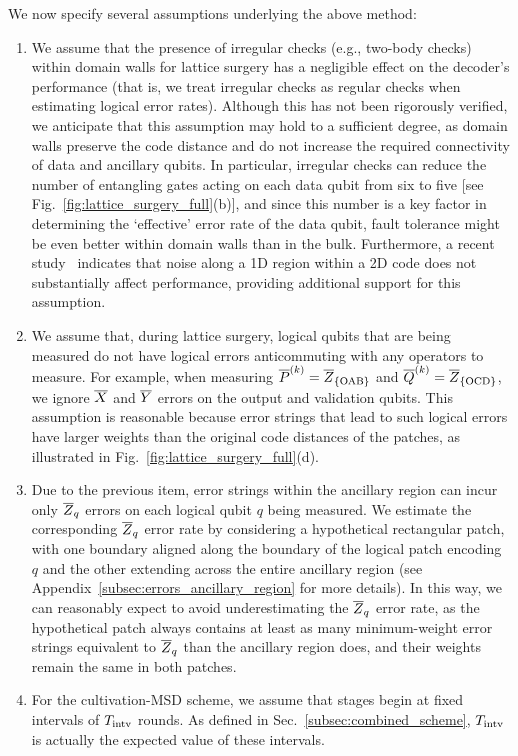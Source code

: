 \documentclass[
 prx,
 reprint,
 superscriptaddress,
 longbibliography,
 dvipsnames
]{revtex4-2}
\begin{document}
\label{para:we_now_clarify}
We now specify several assumptions underlying the above method:
\begin{enumerate}
    \item We assume that the presence of irregular checks (e.g., two-body checks) within domain walls for lattice surgery has a negligible effect on the decoder’s performance (that is, we treat irregular checks as regular checks when estimating logical error rates).
    Although this has not been rigorously verified, we anticipate that this assumption may hold to a sufficient degree, as domain walls preserve the code distance and do not increase the required connectivity of data and ancillary qubits.
    In particular, irregular checks can reduce the number of entangling gates acting on each data qubit from six to five [see Fig.~\ref{fig:lattice_surgery_full}(b)], and since this number is a key factor in determining the `effective' error rate of the data qubit, fault tolerance might be even better within domain walls than in the bulk.
    Furthermore, a recent study~\cite{ramette2024fault} indicates that noise along a 1D region within a 2D code does not substantially affect performance, providing additional support for this assumption.
    \item We assume that, during lattice surgery, logical qubits that are being measured do not have logical errors anticommuting with any operators to measure.
    For example, when measuring $\overline{P}^{(k)} = \overline{Z}_\qty{\text{OAB}}$ and $\overline{Q}^{(k)} = \overline{Z}_\qty{\text{OCD}}$, we ignore $\overline{X}$ and $\overline{Y}$ errors on the output and validation qubits.
    This assumption is reasonable because error strings that lead to such logical errors have larger weights than the original code distances of the patches, as illustrated in Fig.~\ref{fig:lattice_surgery_full}(d).
    \item Due to the previous item, error strings within the ancillary region can incur only $\overline{Z}_q$ errors on each logical qubit $q$ being measured.
    We estimate the corresponding $\overline{Z}_q$ error rate by considering a hypothetical rectangular patch, with one boundary aligned along the boundary of the logical patch encoding $q$ and the other extending across the entire ancillary region (see Appendix~\ref{subsec:errors_ancillary_region} for more details).
    In this way, we can reasonably expect to avoid underestimating the $\overline{Z}_q$ error rate, as the hypothetical patch always contains at least as many minimum-weight error strings equivalent to $\overline{Z}_q$ than the ancillary region does, and their weights remain the same in both patches.
    \item For the cultivation-MSD scheme, we assume that stages begin at fixed intervals of $T_{\mathrm{intv}}$ rounds. 
    As defined in Sec.~\ref{subsec:combined_scheme}, $T_{\mathrm{intv}}$ is actually the expected value of these intervals.
\end{enumerate}
\end{document}
